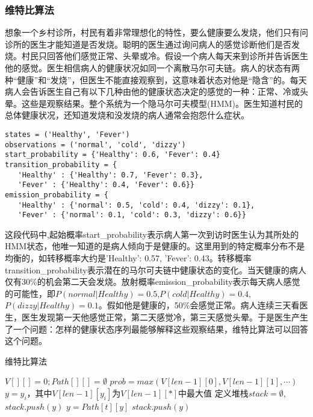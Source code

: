 \subsubsection{维特比算法}
\par 想象一个乡村诊所，村民有着非常理想化的特性，要么健康要么发烧，他们只有问诊所的医生才能知道是否发烧。聪明的医生通过询问病人的感觉诊断他们是否发烧。村民只回答他们感觉正常、头晕或冷。假设一个病人每天来到诊所并告诉医生他的感觉。医生相信病人的健康状况如同一个离散马尔可夫链。病人的状态有两种“健康”和“发烧”，但医生不能直接观察到，这意味着状态对他是“隐含”的。每天病人会告诉医生自己有以下几种由他的健康状态决定的感觉的一种：正常、冷或头晕。这些是观察结果。整个系统为一个隐马尔可夫模型(HMM)。医生知道村民的总体健康状况，还知道发烧和没发烧的病人通常会抱怨什么症状。
\begin{verbatim}
states = ('Healthy', 'Fever')
observations = ('normal', 'cold', 'dizzy')
start_probability = {'Healthy': 0.6, 'Fever': 0.4}
transition_probability = {
   'Healthy' : {'Healthy': 0.7, 'Fever': 0.3},
   'Fever' : {'Healthy': 0.4, 'Fever': 0.6}}
emission_probability = {
   'Healthy' : {'normal': 0.5, 'cold': 0.4, 'dizzy': 0.1},
   'Fever' : {'normal': 0.1, 'cold': 0.3, 'dizzy': 0.6}}
\end{verbatim}
\par 这段代码中,起始概率start\_probability表示病人第一次到访时医生认为其所处的HMM状态，他唯一知道的是病人倾向于是健康的。这里用到的特定概率分布不是均衡的，如转移概率大约是{'Healthy': 0.57, 'Fever': 0.43}。转移概率transition\_probability表示潜在的马尔可夫链中健康状态的变化。当天健康的病人仅有30\%的机会第二天会发烧。放射概率emission\_probability表示每天病人感觉的可能性，即$P(normal|Healthy)=0.5$,$P(cold|Healthy)=0.4$,$P(dizzy|Healthy)=0.1$。假如他是健康的，50\%会感觉正常。病人连续三天看医生，医生发现第一天他感觉正常，第二天感觉冷，第三天感觉头晕。于是医生产生了一个问题：怎样的健康状态序列最能够解释这些观察结果，维特比算法可以回答这个问题。
\begin{algorithm}[H]
\caption{维特比算法}
$V[][] = 0; Path[][]=\emptyset$\;
 {
}
$prob = max(V[len-1][0],V[len-1][1],\cdots)$\;
$y = y_i$，其中$V[len-1][y_i]$为$V[len-1][*]$中最大值\;
定义堆栈$stack = \emptyset$,$stack.push(y)$\;
 {
$y=Path[t][y]$\;
$stack.push(y)$\;
}
\end{algorithm}
